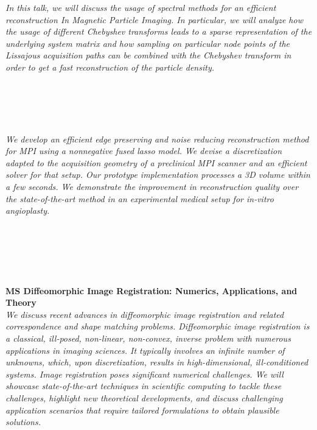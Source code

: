 \begin{multicols}{2}
      \textit{In this talk, we will discuss the usage of spectral methods for an efficient reconstruction In Magnetic Particle Imaging. In particular, we will analyze how the usage of different Chebyshev transforms leads to a sparse representation of the underlying system matrix and how sampling on particular node points of the Lissajous acquisition paths can be combined with the Chebyshev transform in order to get a fast reconstruction of the particle density.}\\
\\ 
        \\
        \\\\
\\
      \textit{We develop an efficient edge preserving and noise reducing reconstruction method for MPI using a nonnegative fused lasso model. We devise a discretization adapted to the acquisition geometry of a preclinical MPI scanner and an efficient solver for that setup. Our prototype implementation processes a 3D volume within a few seconds. We demonstrate the improvement in reconstruction quality over the state-of-the-art method in an experimental medical setup for in-vitro angioplasty.}\\
\\ 
        \\
        \\\\
\\
\end{multicols}
  \noindent\textbf{MS Diffeomorphic Image Registration: Numerics, Applications, and Theory}\\
  \textit{We discuss recent advances in diffeomorphic image registration and related correspondence and shape matching problems. Diffeomorphic image registration is a classical, ill-posed, non-linear, non-convex, inverse problem with numerous applications in imaging sciences. It typically involves an infinite number of unknowns, which, upon discretization, results in high-dimensional, ill-conditioned systems. Image registration poses significant numerical challenges. We will showcase state-of-the-art techniques in scientific computing to tackle these challenges, highlight new theoretical developments, and discuss challenging application scenarios that require tailored formulations to obtain plausible solutions.} \\
    
